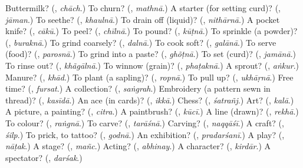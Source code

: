 \begin{tcolorbox}[breakable,colback=teal!4,colframe=teal!35!black,title={Before you move on}]
Buttermilk? (\textbf{}, \emph{chāch}.) To churn? (\textbf{}, \emph{mathnā}.) A starter (for setting curd)? (\textbf{}, \emph{jāman}.) To seethe? (\textbf{}, \emph{khaulnā}.) To drain off (liquid)? (\textbf{}, \emph{nithārnā}.) A pocket knife? (\textbf{}, \emph{cākū}.) To peel? (\textbf{}, \emph{chīlnā}.) To pound? (\textbf{}, \emph{kūṭnā}.) To sprinkle (a powder)? (\textbf{}, \emph{buraknā}.) To grind coarsely? (\textbf{}, \emph{dalnā}.) To cook soft? (\textbf{}, \emph{galānā}.) To serve (food)? (\textbf{}, \emph{parosnā}.) To grind into a paste? (\textbf{}, \emph{ghõṭnā}.) To set (curd)? (\textbf{}, \emph{jamānā}.) To rinse out? (\textbf{}, \emph{khãgālnā}.) To winnow (grain)? (\textbf{}, \emph{phaṭaknā}.) A sprout? (\textbf{}, \emph{aṅkur}.) Manure? (\textbf{}, \emph{khād}.) To plant (a sapling)? (\textbf{}, \emph{ropnā}.) To pull up? (\textbf{}, \emph{ukhāṛnā}.) Free time? (\textbf{}, \emph{fursat}.) A collection? (\textbf{}, \emph{saṅgrah}.) Embroidery (a pattern sewn in thread)? (\textbf{}, \emph{kasīdā}.) An ace (in cards)? (\textbf{}, \emph{ikkā}.) Chess? (\textbf{}, \emph{śatrañj}.) Art? (\textbf{}, \emph{kalā}.) A picture, a painting? (\textbf{}, \emph{citra}.) A paintbrush? (\textbf{}, \emph{kūcī}.) A line (drawn)? (\textbf{}, \emph{rekhā}.) To colour? (\textbf{}, \emph{raṅgnā}.) To carve? (\textbf{}, \emph{tarāśnā}.) Carving? (\textbf{}, \emph{naqqāśī}.) A craft? (\textbf{}, \emph{śilp}.) To prick, to tattoo? (\textbf{}, \emph{godnā}.) An exhibition? (\textbf{}, \emph{pradarśanī}.) A play? (\textbf{}, \emph{nāṭak}.) A stage? (\textbf{}, \emph{mañc}.) Acting? (\textbf{}, \emph{abhinay}.) A character? (\textbf{}, \emph{kirdār}.) A spectator? (\textbf{}, \emph{darśak}.)
\end{tcolorbox}
